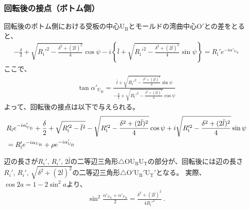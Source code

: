 \subsubsection{回転後の接点（ボトム側）}
回転後のボトム側における受板の中心U$_\mathrm B$とモールドの湾曲中心O$'$との差をとると、
\begin{align*}
  -\frac\delta2+\sqrt{R_\mathrm i'^2-\frac{\delta^2+(2\bar l)^2}4}\cos\psi
  -i\left\{\bar l+\sqrt{R_\mathrm i'^2-\frac{\delta^2+(2\bar l)^2}4}\sin\psi\right\}
  = R_\mathrm i'e^{-i\alpha'_{\mathrm U_\mathrm B}}
\end{align*}
ここで、
\begin{align*}
  \tan\alpha'_{\mathrm U_\mathrm B}
  = \frac{\displaystyle\bar l+\sqrt{R_\mathrm i'^2-\frac{\delta^2+(2\bar l)^2}4}\sin\psi}
         {\displaystyle-\frac\delta2+\sqrt{R_\mathrm i'^2-\frac{\delta^2+(2\bar l)^2}4}\cos\psi}
\end{align*}
よって、回転後の接点は以下で与えられる。
\begin{align}
  \notag
  &  R_\mathrm ie^{-i\alpha'_{\mathrm U_\mathrm B}}
     +\frac\delta2+\sqrt{R_\mathrm i'^2-\bar l^2}-\sqrt{R_\mathrm i'^2-\frac{\delta^2+(2\bar l)^2}4}\cos\psi
     +i\sqrt{R_\mathrm i'^2-\frac{\delta^2+(2\bar l)^2}4}\sin\psi\\
  &= R_\mathrm i'e^{-i\alpha_{\mathrm U_\mathrm B}}+\rho e^{-i\alpha'_{\mathrm U_\mathrm B}}
   \label{eq:afterUBcontact}
\end{align}
\begin{hosoku}
辺の長さが$R_i'$, $R_i'$, $2\bar l$の二等辺三角形$\triangle$OU$_\mathrm B$U$_\mathrm T$の部分が、回転後には辺の長さ$R_i'$, $R_i'$, $\sqrt{\delta^2+(2\bar l)^2}$の二等辺三角形$\triangle$O$'$U$_\mathrm B'$U$_\mathrm T'$となる。
実際、$\cos2a = 1-2\sin^2\!a$より、
\begin{align*}
  \sin^2\frac{\alpha'_{\mathrm U_\mathrm T}+\alpha'_{\mathrm U_\mathrm B}}2
  = \frac{\delta^2+(2\bar l)^2}{4R_\mathrm i'^2}\ .
\end{align*}
\end{hosoku}



